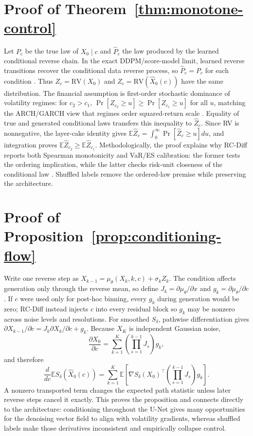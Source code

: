 \documentclass[letterpaper]{article}
\begin{document}
\appendix
\section{Proof of Theorem~\ref{thm:monotone-control}}
Let $P_c$ be the true law of $X_0\mid c$ and $\hat{P}_c$ the law produced by the learned conditional reverse chain. In the exact DDPM/score-model limit, learned reverse transitions recover the conditional data reverse process, so $\hat{P}_c=P_c$ for each condition \citep{ho2020ddpm,song2021score}. Thus $Z_c=\mathrm{RV}(X_0)$ and $\hat Z_c=\mathrm{RV}(\hat X_0(c))$ have the same distribution. The financial assumption is first-order stochastic dominance of volatility regimes: for $c_2>c_1$, $\Pr[Z_{c_2}\ge u]\ge\Pr[Z_{c_1}\ge u]$ for all $u$, matching the ARCH/GARCH view that regimes order squared-return scale \citep{engle1982arch,bollerslev1986garch}. Equality of true and generated conditional laws transfers this inequality to $\hat Z_c$. Since RV is nonnegative, the layer-cake identity gives $\mathbb{E}\hat Z_c=\int_0^\infty\Pr[\hat Z_c\ge u]du$, and integration proves $\mathbb{E}\hat Z_{c_2}\ge\mathbb{E}\hat Z_{c_1}$. Methodologically, the proof explains why RC-Diff reports both Spearman monotonicity and VaR/ES calibration: the former tests the ordering implication, while the latter checks risk-unit closeness of the conditional law \citep{artzner1999coherent,acerbi2002expected,fissler2016higher}. Shuffled labels remove the ordered-law premise while preserving the architecture.

\section{Proof of Proposition~\ref{prop:conditioning-flow}}
Write one reverse step as $X_{k-1}=\mu_\theta(X_k,k,c)+\sigma_kZ_k$. The condition affects generation only through the reverse mean, so define $J_k=\partial\mu_\theta/\partial x$ and $g_k=\partial\mu_\theta/\partial c$. If $c$ were used only for post-hoc binning, every $g_k$ during generation would be zero; RC-Diff instead injects $c$ into every residual block so $g_k$ may be nonzero across noise levels and resolutions. For smoothed $S_\delta$, pathwise differentiation gives $\partial X_{k-1}/\partial c=J_k\partial X_k/\partial c+g_k$. Because $X_K$ is independent Gaussian noise,
\begin{equation}
  \frac{\partial X_0}{\partial c}=\sum_{k=1}^{K}\left(\prod_{s=1}^{k-1}J_s\right)g_k,
\end{equation}
and therefore
\begin{equation}
  \frac{d}{dc}\mathbb{E}S_\delta(\hat{X}_0(c))=\sum_{k=1}^{K}\mathbb{E}\left[\nabla S_\delta(X_0)^\top\left(\prod_{s=1}^{k-1}J_s\right)g_k\right].
\end{equation}
A nonzero transported term changes the expected path statistic unless later reverse steps cancel it exactly. This proves the proposition and connects directly to the architecture: conditioning throughout the U-Net gives many opportunities for the denoising vector field to align with volatility gradients, whereas shuffled labels make those derivatives inconsistent and empirically collapse control.
\end{document}
